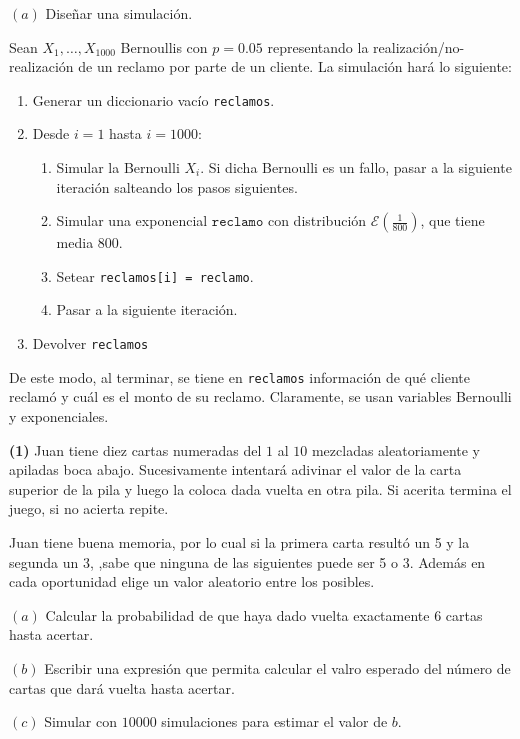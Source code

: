 \documentclass[a4paper, 12pt]{article}
\begin{document}
$(a)$ Diseñar una simulación.

Sean $X_1, \ldots, X_{1000}$ Bernoullis con $p = 0.05$ representando la
realización/no-realización de un reclamo por parte de un cliente. La simulación
hará lo siguiente:

\begin{enumerate}
  \item Generar un diccionario vacío \texttt{reclamos}.
  \item Desde $i=1$ hasta $i = 1000$:
    \begin{enumerate}
      \item Simular la Bernoulli $X_i$. Si dicha Bernoulli es un fallo, pasar a
        la siguiente iteración salteando los pasos siguientes.
      \item Simular una exponencial $\texttt{reclamo}$ con distribución
        $\mathcal{E}(\frac{1}{800})$, que tiene media $800$.
      \item Setear \texttt{reclamos[i] = reclamo}.
      \item Pasar a la siguiente iteración.
    \end{enumerate}
  \item Devolver \texttt{reclamos}
\end{enumerate}

De este modo, al terminar, se tiene en \texttt{reclamos} información de qué
cliente reclamó y cuál es el monto de su reclamo. Claramente, se usan variables
Bernoulli y exponenciales.

\pagebreak 

\textbf{(1)} Juan tiene diez cartas numeradas del $1$ al $10$ mezcladas
aleatoriamente y apiladas boca abajo. Sucesivamente intentará adivinar el valor
de la carta superior de la pila y luego la coloca dada vuelta en otra pila. Si
acerita termina el juego, si no acierta repite. 

Juan tiene buena memoria, por lo cual si la primera carta resultó un 5 y la
segunda un 3, ,sabe que ninguna de las siguientes puede ser 5 o 3. Además en
cada oportunidad elige un valor aleatorio entre los posibles. 

$(a)$ Calcular la probabilidad de que haya dado vuelta exactamente 6 cartas
hasta acertar. 

$(b)$ Escribir una expresión que permita calcular el valro esperado del número
de cartas que dará vuelta hasta acertar. 

$(c)$ Simular con $10000$ simulaciones para estimar el valor de $b$.
\end{document}
